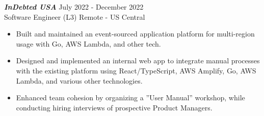 {\sl \textbf{InDebted USA}} \hfill July 2022 - December 2022 \\ Software Engineer (L3) \hfill Remote - US Central
\begin{itemize}
    \item Built and maintained an event-sourced application platform for multi-region usage with Go, AWS Lambda, and other tech.
    \item Designed and implemented an internal web app to integrate manual processes with the existing platform using React/TypeScript, AWS Amplify, Go, AWS Lambda, and various other technologies.
    \item Enhanced team cohesion by organizing a ”User Manual” workshop, while conducting hiring interviews of prospective Product Managers.
\end{itemize}

